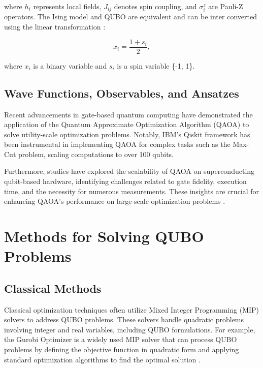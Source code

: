 \documentclass[conference]{IEEEtran}
\begin{document}
where \( h_i \) represents local fields, \( J_{ij} \) denotes spin coupling, and \( \sigma_i^z \) are Pauli-Z operators. 
The Ising model and QUBO are equivalent and can be inter converted using the linear transformation \cite{mandal2020compressedquadratizationhigherorder}:

\begin{equation}
x_i = \frac{1 + s_i}{2},
\end{equation}

where \( x_i \) is a binary variable and \( s_i \) is a spin variable \{-1, 1\}.

\subsection{Wave Functions, Observables, and Ansatzes}
Recent advancements in gate-based quantum computing have demonstrated the application of the Quantum Approximate Optimization Algorithm (QAOA) to solve utility-scale optimization problems. 
Notably, IBM's Qiskit framework has been instrumental in implementing QAOA for complex tasks such as the Max-Cut problem, scaling computations to over 100 qubits. \cite{qiskit_maxcut_tutorial}

Furthermore, studies have explored the scalability of QAOA on superconducting qubit-based hardware, identifying challenges related to gate fidelity, execution time, and the necessity for numerous measurements. 
These insights are crucial for enhancing QAOA's performance on large-scale optimization problems \cite{Weidenfeller2022scalingofquantum}.

\section{Methods for Solving QUBO Problems}

\subsection{Classical Methods}
Classical optimization techniques often utilize Mixed Integer Programming (MIP) solvers to address QUBO problems. 
These solvers handle quadratic problems involving integer and real variables, including QUBO formulations. 
For example, the Gurobi Optimizer is a widely used MIP solver that can process QUBO problems by defining the objective function in quadratic form and applying standard optimization algorithms to find the optimal solution \cite{gurobi_amplify}.
\end{document}
